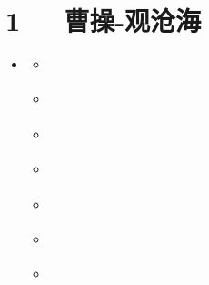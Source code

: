 \documentclass[letterpaper,12pt,english]{sphinxmanual}
\begin{document}
\chapter{1   曹操-观沧海}
\label{\detokenize{p01_u6563_u6587/_u66f9_u64cd-_u89c2_u6ca7_u6d77:id1}}\label{\detokenize{p01_u6563_u6587/_u66f9_u64cd-_u89c2_u6ca7_u6d77::doc}}
\begin{sphinxShadowBox}
\begin{itemize}
\item {} 
\label{\detokenize{p01_u6563_u6587/_u66f9_u64cd-_u89c2_u6ca7_u6d77:id10}}{\hyperref[\detokenize{p01_u6563_u6587/_u66f9_u64cd-_u89c2_u6ca7_u6d77:id1}]{}}
\begin{itemize}
\item {} 
\label{\detokenize{p01_u6563_u6587/_u66f9_u64cd-_u89c2_u6ca7_u6d77:id11}}{\hyperref[\detokenize{p01_u6563_u6587/_u66f9_u64cd-_u89c2_u6ca7_u6d77:id3}]{}}

\item {} 
\label{\detokenize{p01_u6563_u6587/_u66f9_u64cd-_u89c2_u6ca7_u6d77:id12}}{\hyperref[\detokenize{p01_u6563_u6587/_u66f9_u64cd-_u89c2_u6ca7_u6d77:id4}]{}}

\item {} 
\label{\detokenize{p01_u6563_u6587/_u66f9_u64cd-_u89c2_u6ca7_u6d77:id13}}{\hyperref[\detokenize{p01_u6563_u6587/_u66f9_u64cd-_u89c2_u6ca7_u6d77:id5}]{}}

\item {} 
\label{\detokenize{p01_u6563_u6587/_u66f9_u64cd-_u89c2_u6ca7_u6d77:id14}}{\hyperref[\detokenize{p01_u6563_u6587/_u66f9_u64cd-_u89c2_u6ca7_u6d77:id6}]{}}

\item {} 
\label{\detokenize{p01_u6563_u6587/_u66f9_u64cd-_u89c2_u6ca7_u6d77:id15}}{\hyperref[\detokenize{p01_u6563_u6587/_u66f9_u64cd-_u89c2_u6ca7_u6d77:id7}]{}}

\item {} 
\label{\detokenize{p01_u6563_u6587/_u66f9_u64cd-_u89c2_u6ca7_u6d77:id16}}{\hyperref[\detokenize{p01_u6563_u6587/_u66f9_u64cd-_u89c2_u6ca7_u6d77:id8}]{}}

\item {} 
\label{\detokenize{p01_u6563_u6587/_u66f9_u64cd-_u89c2_u6ca7_u6d77:id17}}{\hyperref[\detokenize{p01_u6563_u6587/_u66f9_u64cd-_u89c2_u6ca7_u6d77:id9}]{}}

\end{itemize}

\end{itemize}
\end{sphinxShadowBox}
\end{document}
